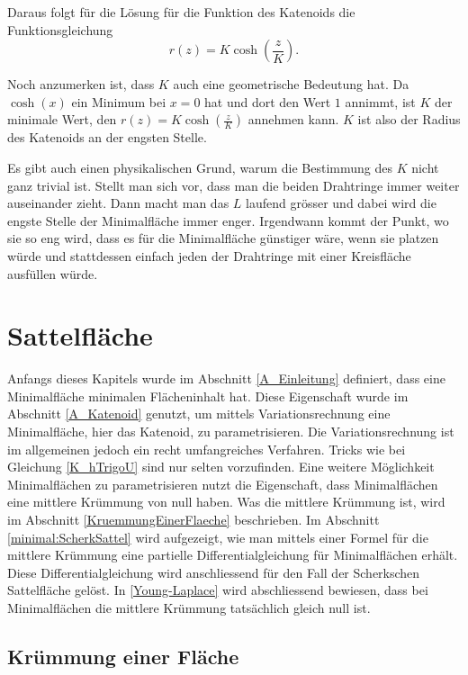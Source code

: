 \begin{refsection}
Daraus folgt für die Lösung für die Funktion des Katenoids die Funktionsgleichung 
\begin{equation} \label{K_rz}
r(z)=K \cosh\left(\frac{z}{K}\right).
\end{equation}

Noch anzumerken ist, dass $K$ auch eine geometrische Bedeutung hat. Da $\cosh(x)$ ein Minimum bei $x=0$ hat und dort den Wert $1$ annimmt, ist $K$ der minimale Wert, den $r(z)=K \cosh\left(\frac{z}{K}\right)$ annehmen kann. $K$ ist also der Radius des 
Katenoids an der engsten Stelle.

Es gibt auch einen physikalischen Grund, warum die Bestimmung des $K $ nicht ganz trivial ist. 
Stellt man sich vor, dass man die beiden Drahtringe immer weiter auseinander zieht. Dann macht man das $L$ laufend grösser und dabei wird die engste Stelle der Minimalfläche immer enger. Irgendwann kommt der Punkt, wo sie so eng wird, dass es für die Minimalfläche günstiger wäre, wenn sie platzen würde und stattdessen einfach jeden der Drahtringe mit einer Kreisfläche ausfüllen würde.


\section{Sattelfläche}
%
Anfangs dieses Kapitels wurde im Abschnitt \ref{A_Einleitung} definiert, dass eine Minimalfläche minimalen Flächeninhalt hat. Diese Eigenschaft wurde im Abschnitt \ref{A_Katenoid} genutzt, um mittels Variationsrechnung eine Minimalfläche, hier das Katenoid, zu parametrisieren. Die Variationsrechnung ist im allgemeinen jedoch ein recht umfangreiches Verfahren. Tricks wie bei Gleichung \eqref{K_hTrigoU} sind nur selten vorzufinden. Eine weitere Möglichkeit Minimalflächen zu parametrisieren nutzt die Eigenschaft, dass Minimalflächen eine mittlere Krümmung von null haben. Was die mittlere Krümmung ist, wird im Abschnitt \ref{KruemmungEinerFlaeche} beschrieben. Im Abschnitt \ref{minimal:ScherkSattel} wird aufgezeigt, wie man mittels einer Formel für die mittlere Krümmung eine partielle Differentialgleichung für Minimalflächen erhält. Diese Differentialgleichung wird anschliessend für den Fall der Scherkschen Sattelfläche gelöst. In \ref{Young-Laplace} wird abschliessend bewiesen, dass bei Minimalflächen die mittlere Krümmung tatsächlich gleich null ist.

\subsection{Krümmung einer Fläche}
\label{KruemmungEinerFlaeche}


\end{refsection}
